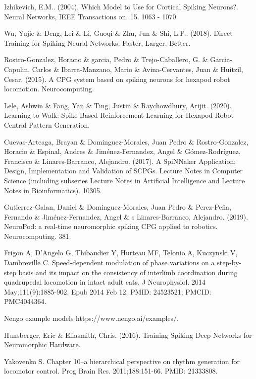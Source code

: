 \documentclass[runningheads]{llncs}
\begin{document}
\begin{thebibliography}{99}
Izhikevich, E.M.. (2004). Which Model to Use for Cortical Spiking Neurons?. Neural Networks, IEEE Transactions on. 15. 1063 - 1070.

Wu, Yujie \& Deng, Lei \& Li, Guoqi \& Zhu, Jun \& Shi, L.P.. (2018). Direct Training for Spiking Neural Networks: Faster, Larger, Better. 

Rostro-Gonzalez, Horacio \& garcia, Pedro \& Trejo-Caballero, G. \& Garcia-Capulin, Carlos \& Ibarra-Manzano, Mario \& Avina-Cervantes, Juan \& Huitzil, Cesar. (2015). A CPG system based on spiking neurons for hexapod robot locomotion. Neurocomputing. 

Lele, Ashwin \& Fang, Yan \& Ting, Justin \& Raychowdhury, Arijit. (2020). Learning to Walk: Spike Based Reinforcement Learning for Hexapod Robot Central Pattern Generation. 

Cuevas-Arteaga, Brayan \& Dominguez-Morales, Juan Pedro \& Rostro-Gonzalez, Horacio \& Espinal, Andres \& Jiménez-Fernandez, Angel \& Gómez-Rodríguez, Francisco \& Linares-Barranco, Alejandro. (2017). A SpiNNaker Application: Design, Implementation and Validation of SCPGs. Lecture Notes in Computer Science (including subseries Lecture Notes in Artificial Intelligence and Lecture Notes in Bioinformatics). 10305. 

Gutierrez-Galan, Daniel \& Dominguez-Morales, Juan Pedro \& Perez-Peña, Fernando \& Jiménez-Fernandez, Angel \& s Linares-Barranco, Alejandro. (2019). NeuroPod: a real-time neuromorphic spiking CPG applied to robotics. Neurocomputing. 381. 

Frigon A, D'Angelo G, Thibaudier Y, Hurteau MF, Telonio A, Kuczynski V, Dambreville C. Speed-dependent modulation of phase variations on a step-by-step basis and its impact on the consistency of interlimb coordination during quadrupedal locomotion in intact adult cats. J Neurophysiol. 2014 May;111(9):1885-902. Epub 2014 Feb 12. PMID: 24523521; PMCID: PMC4044364.

Nengo example models
https://www.nengo.ai/examples/. 

Hunsberger, Eric \& Eliasmith, Chris. (2016). Training Spiking Deep Networks for Neuromorphic Hardware. 

Yakovenko S. Chapter 10--a hierarchical perspective on rhythm generation for locomotor control. Prog Brain Res. 2011;188:151-66. PMID: 21333808.

\end{thebibliography}
\end{document}

